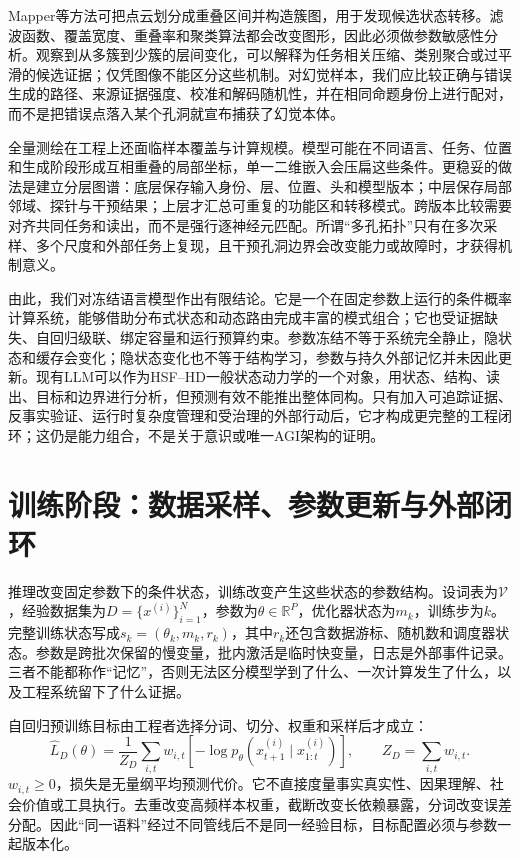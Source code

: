 Mapper等方法可把点云划分成重叠区间并构造簇图，用于发现候选状态转移。滤波函数、覆盖宽度、重叠率和聚类算法都会改变图形，因此必须做参数敏感性分析。观察到从多簇到少簇的层间变化，可以解释为任务相关压缩、类别聚合或过平滑的候选证据；仅凭图像不能区分这些机制。对幻觉样本，我们应比较正确与错误生成的路径、来源证据强度、校准和解码随机性，并在相同命题身份上进行配对，而不是把错误点落入某个孔洞就宣布捕获了幻觉本体。

\label{subsec:global_manifold_mapping}
全量测绘在工程上还面临样本覆盖与计算规模。模型可能在不同语言、任务、位置和生成阶段形成互相重叠的局部坐标，单一二维嵌入会压扁这些条件。更稳妥的做法是建立分层图谱：底层保存输入身份、层、位置、头和模型版本；中层保存局部邻域、探针与干预结果；上层才汇总可重复的功能区和转移模式。跨版本比较需要对齐共同任务和读出，而不是强行逐神经元匹配。所谓“多孔拓扑”只有在多次采样、多个尺度和外部任务上复现，且干预孔洞边界会改变能力或故障时，才获得机制意义。

由此，我们对冻结语言模型作出有限结论。它是一个在固定参数上运行的条件概率计算系统，能够借助分布式状态和动态路由完成丰富的模式组合；它也受证据缺失、自回归级联、绑定容量和运行预算约束。参数冻结不等于系统完全静止，隐状态和缓存会变化；隐状态变化也不等于结构学习，参数与持久外部记忆并未因此更新。现有LLM可以作为HSF--HD一般状态动力学的一个对象，用状态、结构、读出、目标和边界进行分析，但预测有效不能推出整体同构。只有加入可追踪证据、反事实验证、运行时复杂度管理和受治理的外部行动后，它才构成更完整的工程闭环；这仍是能力组合，不是关于意识或唯一AGI架构的证明。

\section{训练阶段：数据采样、参数更新与外部闭环}
\label{sec:section_4089}

推理改变固定参数下的条件状态，训练改变产生这些状态的参数结构。设词表为$\mathcal V$，经验数据集为$D=\{x^{(i)}\}_{i=1}^{N}$，参数为$\theta\in\mathbb R^P$，优化器状态为$m_k$，训练步为$k$。完整训练状态写成$s_k=(\theta_k,m_k,r_k)$，其中$r_k$还包含数据游标、随机数和调度器状态。参数是跨批次保留的慢变量，批内激活是临时快变量，日志是外部事件记录。三者不能都称作“记忆”，否则无法区分模型学到了什么、一次计算发生了什么，以及工程系统留下了什么证据。

自回归预训练目标由工程者选择分词、切分、权重和采样后才成立：
\[
\widehat L_D(\theta)=\frac{1}{Z_D}\sum_{i,t}w_{i,t}
[-\log p_\theta(x_{t+1}^{(i)}\mid x_{1:t}^{(i)})],
\qquad Z_D=\sum_{i,t}w_{i,t}.
\]
$w_{i,t}\geq0$，损失是无量纲平均预测代价。它不直接度量事实真实性、因果理解、社会价值或工具执行。去重改变高频样本权重，截断改变长依赖暴露，分词改变误差分配。因此“同一语料”经过不同管线后不是同一经验目标，目标配置必须与参数一起版本化。

